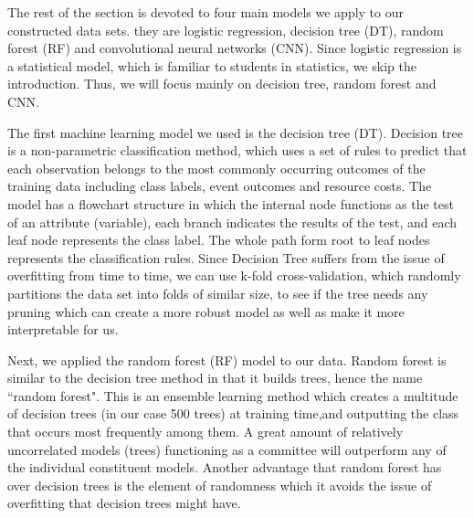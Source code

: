 \documentclass[12pt]{article}
\begin{document}
The rest of the section is devoted to four main models we apply to our constructed data sets. they are logistic regression, decision tree (DT), random forest (RF) and convolutional neural networks (CNN). Since logistic regression is a statistical model, which is familiar to students in statistics, we skip the introduction. Thus, we will focus mainly on decision tree, random forest and CNN.

The first machine learning model we used is the decision tree (DT). Decision tree is a non-parametric classification method, which uses a set of rules to predict that each observation belongs to the most commonly occurring outcomes of the training data including class labels, event outcomes and resource costs. The model has a flowchart structure in which the internal node functions as the test of an attribute (variable), each branch indicates the results of the test, and each leaf node represents the class label. The whole path form root to leaf nodes represents the classification rules. Since Decision Tree suffers from the issue of overfitting from time to time, we can use k-fold cross-validation, which randomly partitions the data set into folds of similar size, to see if the tree needs any pruning which can create a more robust model as well as make it more interpretable for us.

Next, we applied the random forest (RF) model to our data. Random forest is similar to the decision tree method in that it builds trees, hence the name ``random forest". This is an ensemble learning method which creates a multitude of decision trees (in our case 500 trees) at training time,and outputting the class that occurs most frequently among them. A great amount of relatively uncorrelated models (trees) functioning as a committee will outperform any of the individual constituent models. Another advantage that random forest has over decision trees is the element of randomness which it avoids the issue of overfitting that decision trees might have.
\end{document}

